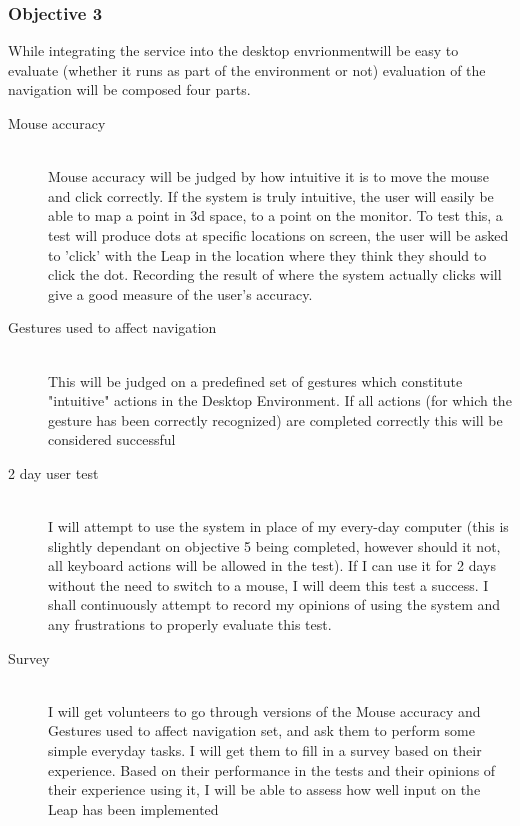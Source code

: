 \documentclass[a4paper]{article}
\begin{document}
\subsubsection{Objective 3}
While integrating the service into the desktop envrionmentwill be easy to evaluate (whether it runs as part of the environment or not) evaluation of the navigation will be composed four parts.
\begin{description}

\item[Mouse accuracy]{\hfill \\
Mouse accuracy will be judged by how intuitive it is to move the mouse and click correctly. If the system is truly intuitive, the user will easily be able to map a point in 3d space, to a point on the monitor. To test this, a test will produce dots at specific locations on screen, the user will be asked to 'click' with the Leap in the location where they think they should to click the dot. Recording the result of where the system actually clicks will give a good measure of the user's accuracy.}
\item[Gestures used to affect navigation]{\hfill \\
This will be judged on a predefined set of gestures which constitute "intuitive" actions in the Desktop Environment. If all actions (for which the gesture has been correctly recognized) are completed correctly this will be considered successful}
\item[2 day user test]{\hfill \\
I will attempt to use the system in place of my every-day computer (this is slightly dependant on objective 5 being completed, however should it not, all keyboard actions will be allowed in the test). If I can use it for 2 days without the need to switch to a mouse, I will deem this test a success. I shall continuously attempt to record my opinions of using the system and any frustrations to properly evaluate this test. }
\item[Survey] {\hfill \\
I will get volunteers to go through versions of the Mouse accuracy and Gestures used to affect navigation set, and ask them to perform some simple everyday tasks. I will get them to fill in a survey based on their experience. Based on their performance in the tests and their opinions of their experience using it, I will be able to assess how well input on the Leap has been implemented } 
\end{description}
\end{document}
